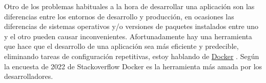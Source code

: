 Otro de los problemas habituales a la hora de desarrollar una aplicación son las diferencias entre los entornos de desarrollo y producción, en ocasiones las diferencias de sistemas operativos y/o versiones de paquetes instalados entre uno y el otro pueden causar inconvenientes. Afortunadamente hay una herramienta que hace que el desarrollo de una aplicación sea más eficiente y predecible, eliminando tareas de configuración repetitivas, estoy hablando de \href{docker.com}{Docker} \cite{docker_docs}. Según la encuesta de 2022 de Stackoverflow \cite{encuesta2022} Docker es la herramienta más amada por los desarrolladores.






